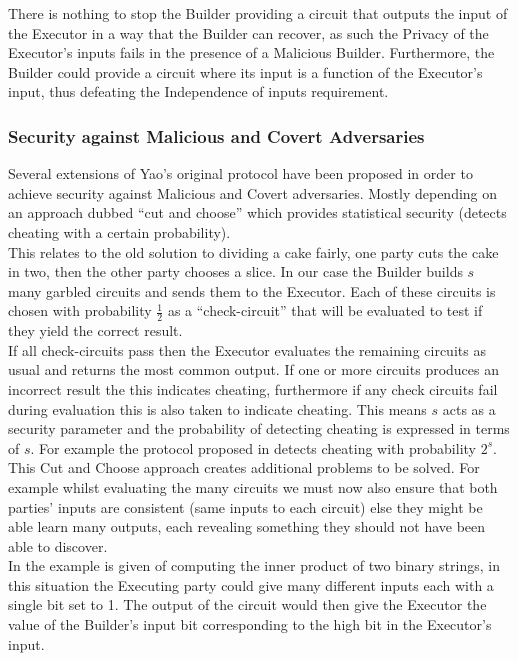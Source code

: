 \documentclass[a4paper,10pt]{article}
\begin{document}
				There is nothing to stop the Builder providing a circuit that outputs the input of the Executor in a way that the Builder can recover, as such the Privacy of the Executor's inputs fails in the presence of a Malicious Builder. Furthermore, the Builder could provide a circuit where its input is a function of the Executor's input, thus defeating the Independence of inputs requirement.


			\subsubsection{Security against Malicious and Covert Adversaries}
				Several extensions of Yao's original protocol have been proposed in order to achieve security against Malicious and Covert adversaries. Mostly depending on an approach dubbed ``cut and choose'' which provides statistical security (detects cheating with a certain probability).\\

				This relates to the old solution to dividing a cake fairly, one party cuts the cake in two, then the other party chooses a slice. In our case the Builder builds $s$ many garbled circuits and sends them to the Executor. Each of these circuits is chosen with probability $\frac{1}{2}$ as a ``check-circuit'' that will be evaluated to test if they yield the correct result.\\

				If all check-circuits pass then the Executor evaluates the remaining circuits as usual and returns the most common output. If one or more circuits produces an incorrect result the this indicates cheating, furthermore if any check circuits fail during evaluation this is also taken to indicate cheating. This means $s$ acts as a security parameter and the probability of detecting cheating is expressed in terms of $s$. For example the protocol proposed in \cite{Lindell_CnC_2014} detects cheating with probability $2^s$.\\

				This Cut and Choose approach creates additional problems to be solved. For example whilst evaluating the many circuits we must now also ensure that both parties' inputs are consistent (same inputs to each circuit) else they might be able learn many outputs, each revealing something they should not have been able to discover.\\

				In \cite{LindellAndPinkas2007} the example is given of computing the inner product of two binary strings, in this situation the Executing party could give many different inputs each with a single bit set to 1. The output of the circuit would then give the Executor the value of the Builder's input bit corresponding to the high bit in the Executor's input.\\
\end{document}
